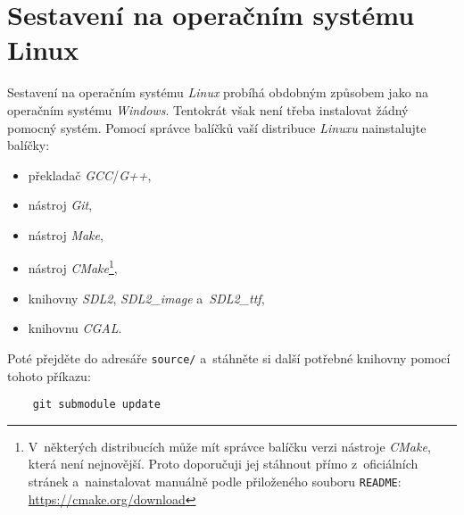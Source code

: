 \section*{Sestavení na operačním systému Linux}

Sestavení na operačním systému \emph{Linux} probíhá obdobným způsobem jako na operačním systému \emph{Windows}. Tentokrát však není třeba instalovat žádný pomocný systém. Pomocí správce balíčků vaší distribuce \emph{Linuxu} nainstalujte balíčky:
\begin{itemize}
    \item překladač \emph{GCC}/\emph{G++},
    \item nástroj \emph{Git},
    \item nástroj \emph{Make},
    \item nástroj \emph{CMake}\footnote{V~některých distribucích může mít správce balíčku verzi nástroje \emph{CMake}, která není nejnovější. Proto doporučuji jej stáhnout přímo z~oficiálních stránek a~nainstalovat manuálně podle přiloženého souboru \texttt{README}: \url{https://cmake.org/download}},
    \item knihovny \emph{SDL2}, \emph{SDL2\_image} a~\emph{SDL2\_ttf},
    \item knihovnu \emph{CGAL}.
\end{itemize}
Poté přejděte do adresáře \texttt{source/} a~stáhněte si další potřebné knihovny pomocí tohoto příkazu:
\begin{verbatim}
    git submodule update
\end{verbatim}


